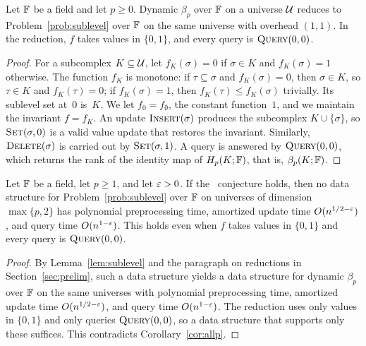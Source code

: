\begin{lemma}\label{lem:sublevel}
Let $\mathbb{F}$ be a field and let $p\ge0$.
Dynamic $\beta_p$ over $\mathbb{F}$ on a universe $\mathcal{U}$ reduces to Problem~\ref{prob:sublevel} over $\mathbb{F}$ on the same universe with overhead $(1,1)$.
In the reduction, $f$ takes values in $\{0,1\}$, and every query is $\textsc{Query}(0,0)$.
\end{lemma}

\begin{proof}
For a subcomplex $K\subseteq\mathcal{U}$, let $f_K(\sigma)=0$ if $\sigma\in K$ and $f_K(\sigma)=1$ otherwise.
The function $f_K$ is monotone: if $\tau\subseteq\sigma$ and $f_K(\sigma)=0$, then $\sigma\in K$, so $\tau\in K$ and $f_K(\tau)=0$; if $f_K(\sigma)=1$, then $f_K(\tau)\le f_K(\sigma)$ trivially.
Its sublevel set at~$0$ is~$K$.
We let $f_0=f_{\emptyset}$, the constant function~$1$, and we maintain the invariant $f=f_K$.
An update $\textsc{Insert}(\sigma)$ produces the subcomplex $K\cup\{\sigma\}$, so $\textsc{Set}(\sigma,0)$ is a valid value update that restores the invariant.
Similarly, $\textsc{Delete}(\sigma)$ is carried out by $\textsc{Set}(\sigma,1)$.
A query is answered by $\textsc{Query}(0,0)$, which returns the rank of the identity map of $H_p(K;\mathbb{F})$, that is, $\beta_p(K;\mathbb{F})$.
\end{proof}

\begin{corollary}\label{cor:persistence}
Let $\mathbb{F}$ be a field, let $p\ge1$, and let $\varepsilon>0$.
If the \OMv\ conjecture holds, then no data structure for Problem~\ref{prob:sublevel} over $\mathbb{F}$ on universes of dimension $\max\{p,2\}$ has polynomial preprocessing time, amortized update time $O(n^{1/2-\varepsilon})$, and query time $O(n^{1-\varepsilon})$.
This holds even when $f$ takes values in $\{0,1\}$ and every query is $\textsc{Query}(0,0)$.
\end{corollary}

\begin{proof}
By Lemma~\ref{lem:sublevel} and the paragraph on reductions in Section~\ref{sec:prelim}, such a data structure yields a data structure for dynamic $\beta_p$ over $\mathbb{F}$ on the same universes with polynomial preprocessing time, amortized update time $O(n^{1/2-\varepsilon})$, and query time $O(n^{1-\varepsilon})$.
The reduction uses only values in $\{0,1\}$ and only queries $\textsc{Query}(0,0)$, so a data structure that supports only these suffices.
This contradicts Corollary~\ref{cor:allp}.
\end{proof}

